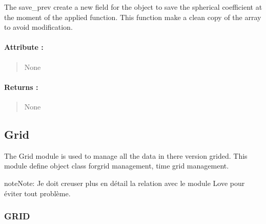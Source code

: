 \documentclass[letterpaper,10pt,english]{sphinxmanual}
\begin{document}
\begin{fulllineitems}
\label{\detokenize{spharm_doc:SL_C0de.spharm.sphericalobject.save_prev}}
\pysigstartsignatures
{}
\pysigstopsignatures
\sphinxAtStartPar
The \label{\detokenize{spharm_doc:save-prev}}save\_prev create a new field for the object to save the spherical coefficient at the moment of the applied function. 
This function make a clean copy of the array to avoid modification.


\paragraph{Attribute :}
\label{\detokenize{spharm_doc:id6}}\begin{quote}

\sphinxAtStartPar
None
\end{quote}


\paragraph{Returns :}
\label{\detokenize{spharm_doc:id7}}\begin{quote}

\sphinxAtStartPar
None
\end{quote}

\end{fulllineitems}


\sphinxstepscope


\subsection{Grid}
\label{\detokenize{Grid_doc:grid}}\label{\detokenize{Grid_doc::doc}}
\sphinxAtStartPar
The Grid module is used to manage all the data in there version grided. This module define object class forgrid management, time grid management.

\begin{sphinxadmonition}{note}{Note:}
\sphinxAtStartPar
Je doit creuser plus en détail la relation avec le module Love pour éviter tout problème.
\end{sphinxadmonition}

\sphinxstepscope


\subsubsection{GRID}
\label{\detokenize{GRID_doc/GRID_class_doc:grid}}\label{\detokenize{GRID_doc/GRID_class_doc::doc}}
\end{document}
